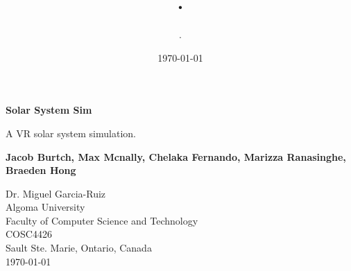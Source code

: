 \documentclass{article}
\author{.}
\title{.}
\date{\today}
\begin{document}
    \begin{titlepage}
        \begin{center}
            \vspace*{\fill}

            \Huge
            \textbf{Solar System Sim}

            \vspace{0.5cm}
            \Large
            A VR solar system simulation.

            \vspace{1.5cm}

            \textbf{Jacob Burtch, Max Mcnally, Chelaka Fernando, Marizza Ranasinghe, Braeden Hong}

            \Large
            Dr. Miguel Garcia-Ruiz\\
            Algoma University\\
            Faculty of Computer Science and Technology\\
            COSC4426\\
            Sault Ste. Marie, Ontario, Canada\\
            \today
            \vspace*{\fill}
        \end{center}
    \end{titlepage}
    \newpage
\end{document}
